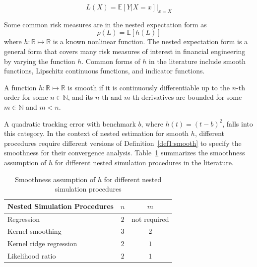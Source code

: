 $$ L(X) = \mathbb{E}\left[ Y|X=x \right]\vert_{x=X} $$

Some common risk measures are in the nested expectation form as
$$\rho(L) = \mathbb{E}\left[ h(L) \right]$$
where $h: \mathbb{R} \mapsto \mathbb{R}$ is a known nonlinear function. 
The nested expectation form is a general form that covers many risk measures of interest in financial engineering by varying the function $h$.
Common forms of $h$ in the literature include smooth functions, Lipschitz continuous functions, and indicator functions.

\begin{definition}\label{def1:smooth}
    A function $h: \mathbb{R} \mapsto \mathbb{R}$ is smooth if it is continuously differentiable up to the $n$-th order for some $n \in \mathbb{N}$, 
    and its $n$-th and $m$-th derivatives are bounded for some $m \in \mathbb{N}$ and $m < n$.
\end{definition}

A quadratic tracking error with benchmark $b$, where $h(t) = (t - b)^2$, falls into this category.
In the context of nested estimation for smooth $h$, different procedures require different versions of Definition~\ref{def1:smooth} to specify the smoothness for their convergence analysis.
Table~\ref{tab1:smoothness} summarizes the smoothness assumption of $h$ for different nested simulation procedures in the literature.

\begin{table}[ht!]
    \centering
    \begin{tabular}{lcc}
    \toprule
    \textbf{Nested Simulation Procedures} & $n$ & $m$ \\
    \midrule
    Regression & $2$ & not required \\
    Kernel smoothing & $3$ & $2$ \\
    Kernel ridge regression & $2$ & $1$ \\
    Likelihood ratio & $2$ & $1$ \\
    \bottomrule
    \end{tabular}
    \caption{Smoothness assumption of $h$ for different nested simulation procedures}
\label{tab1:smoothness}
\end{table}

